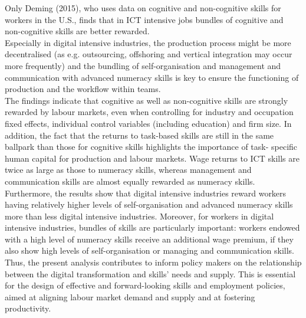 Only Deming (2015), who uses data on cognitive and non-cognitive skills for workers in the U.S., finds that in ICT intensive jobs bundles of cognitive and non-cognitive skills are better rewarded.\\

Especially in digital intensive industries, the production process might be more decentralised (as e.g. outsourcing, offshoring and vertical integration may occur more frequently) and the bundling of self-organisation and management and communication with advanced numeracy skills is key to ensure the functioning of production and the workflow within teams.\\

The findings indicate that cognitive as well as non-cognitive skills are strongly rewarded by labour markets, even when controlling for industry and occupation fixed effects, individual control variables (including education) and firm size. In addition, the fact that the returns to task-based skills are still in the same ballpark than those for cognitive skills highlights the importance of task- specific human capital for production and labour markets. Wage returns to ICT skills are twice as large as those to numeracy skills, whereas management and communication skills are almost equally rewarded as numeracy skills.\\

Furthermore, the results show that digital intensive industries reward workers having relatively higher levels of self-organisation and advanced numeracy skills more than less digital intensive industries. Moreover, for workers in digital intensive industries, bundles of skills are particularly important: workers endowed with a high level of numeracy skills receive an additional wage premium, if they also show high levels of self-organisation or managing and communication skills. Thus, the present analysis contributes to inform policy makers on the relationship between the digital transformation and skills’ needs and supply. This is essential for the design of effective and forward-looking skills and employment policies, aimed at aligning labour market demand and supply and at fostering productivity.\\

